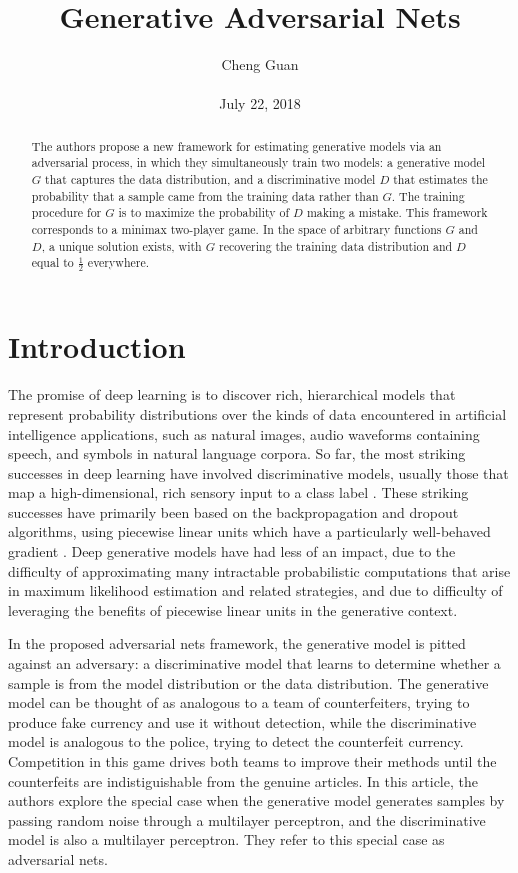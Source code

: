 \documentclass[10pt,twocolumn,letterpaper]{article}
\title{Generative Adversarial Nets}
\author{Cheng Guan\\\\
July 22, 2018}
\begin{document}
\maketitle
\begin{abstract}
The authors propose a new framework for estimating generative models via an adversarial process, in which they simultaneously train two models: a generative model $G$
that captures the data distribution, and a discriminative model $D$ that estimates
the probability that a sample came from the training data rather than $G$. The training procedure for $G$ is to maximize the probability of $D$ making a mistake. This
framework corresponds to a minimax two-player game. In the space of arbitrary
functions $G$ and $D$, a unique solution exists, with $G$ recovering the training data
distribution and $D$ equal to $\frac{1}{2}$ everywhere.
\end{abstract}
\section{Introduction}
The promise of deep learning is to discover rich, hierarchical models  that represent probability
distributions over the kinds of data encountered in artificial intelligence applications, such as natural
images, audio waveforms containing speech, and symbols in natural language corpora. So far, the
most striking successes in deep learning have involved discriminative models, usually those that
map a high-dimensional, rich sensory input to a class label \cite{hinton2012deep,krizhevsky2012imagenet}. These striking successes have
primarily been based on the backpropagation and dropout algorithms, using piecewise linear units
\cite{goodfellow2013maxout,jarrett2009best} which have a particularly well-behaved gradient . Deep generative models have had less
of an impact, due to the difficulty of approximating many intractable probabilistic computations that
arise in maximum likelihood estimation and related strategies, and due to difficulty of leveraging
the benefits of piecewise linear units in the generative context.
\par
In the proposed adversarial nets framework, the generative model is pitted against an adversary: a
discriminative model that learns to determine whether a sample is from the model distribution or the
data distribution. The generative model can be thought of as analogous to a team of counterfeiters,
trying to produce fake currency and use it without detection, while the discriminative model is
analogous to the police, trying to detect the counterfeit currency. Competition in this game drives
both teams to improve their methods until the counterfeits are indistiguishable from the genuine
articles. In this article, the authors explore the special case when the generative model generates samples
by passing random noise through a multilayer perceptron, and the discriminative model is also a
multilayer perceptron. They refer to this special case as adversarial nets.
\end{document}
